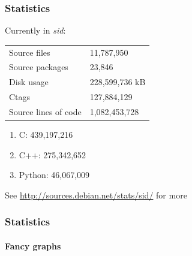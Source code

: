 \documentclass{beamer}
\begin{document}
\begin{frame}
  \frametitle{Statistics}
  Currently in \textit{sid}:
  \begin{center}
    \begin{tabular}{l|l}
      Source files & 11,787,950 \\
      Source packages & 23,846 \\
      Disk usage & 228,599,736 kB \\
      Ctags & 127,884,129 \\
      Source lines of code & 1,082,453,728 \\
    \end{tabular}
  \end{center}
  \pause
  \begin{enumerate}
  \item C: 439,197,216
  \item C++: 275,342,652
  \item Python: 46,067,009
  \end{enumerate}
  See \url{http://sources.debian.net/stats/sid/} for more
\end{frame}

\begin{frame}
  \frametitle{Statistics}
  \framesubtitle{Fancy graphs}
\end{frame}
\end{document}
